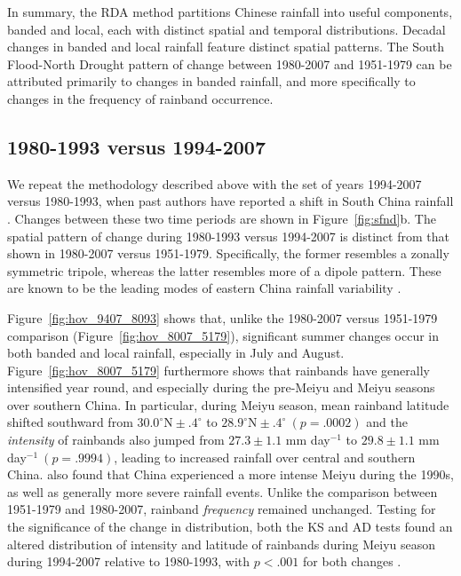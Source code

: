 \documentclass[9pt,twocolumn,twoside,lineno]{pnas-new}
\begin{document}
	In summary, the RDA method partitions Chinese rainfall into useful components, banded and local, each with distinct spatial and temporal distributions. Decadal changes in banded and local rainfall feature distinct spatial patterns. The South Flood-North Drought pattern of change between 1980-2007 and 1951-1979 can be attributed primarily to changes in banded rainfall, and more specifically to changes in the frequency of rainband occurrence.
	
\subsection{1980-1993 versus 1994-2007}
	
	We repeat the methodology described above with the set of years 1994-2007 versus 1980-1993, when past authors have reported a shift in South China rainfall \citep{Kwon2007,Wu2010,Yim2013}. Changes between these two time periods are shown in Figure~\ref{fig:sfnd}b. The spatial pattern of change during 1980-1993 versus 1994-2007 is distinct from that shown in 1980-2007 versus 1951-1979. Specifically, the former resembles a zonally symmetric tripole, whereas the latter resembles more of a dipole pattern. These are known to be the leading modes of eastern China rainfall variability \citep{Day2015}.
	
	Figure~\ref{fig:hov_9407_8093} shows that, unlike the 1980-2007 versus 1951-1979 comparison (Figure~\ref{fig:hov_8007_5179}), significant summer changes occur in both banded and local rainfall, especially in July and August. Figure~\ref{fig:hov_8007_5179} furthermore shows that rainbands have generally intensified year round, and especially during the pre-Meiyu and Meiyu seasons over southern China. In particular, during Meiyu season, mean rainband latitude shifted southward from $30.0^\circ \textrm{N} \pm .4^\circ$ to $28.9^\circ \textrm{N} \pm .4^\circ\ (p=.0002)$ and the \textit{intensity} of rainbands also jumped from $27.3 \pm 1.1$ mm day$^{-1}$ to $29.8 \pm 1.1$ mm day$^{-1}\ (p=.9994)$, leading to increased rainfall over central and southern China. \citet{Zou2015} also found that China experienced a more intense Meiyu during the 1990s, as well as generally more severe rainfall events. Unlike the comparison between 1951-1979 and 1980-2007, rainband \textit{frequency} remained unchanged. Testing for the significance of the change in distribution, both the KS and AD tests found an altered distribution of intensity and latitude of rainbands during Meiyu season during 1994-2007 relative to 1980-1993, with $p<.001$ for both changes \citet{Day2016}.
	
\end{document}
